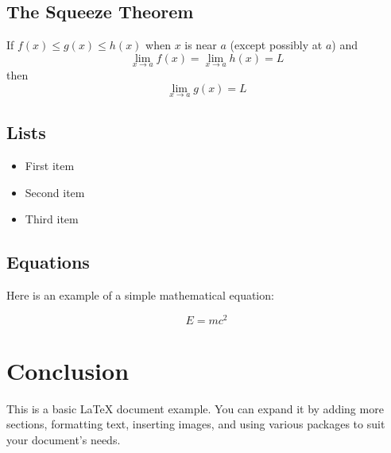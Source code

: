 \documentclass{article}
\begin{document}
\subsection*{The Squeeze Theorem}
If \( f(x) \leq g(x) \leq h(x)\) when \( x \) is near \( a \) (except possibly at \( a \)) and
\[
\lim_{x \to a} f(x) = \lim_{x \to a} h(x) = L
\]
then
\[
\lim_{x \to a} g(x) = L
\]

\subsection{Lists}
\begin{itemize}
    \item First item
    \item Second item
    \item Third item
\end{itemize}

\subsection{Equations}
Here is an example of a simple mathematical equation:

\begin{equation}
    E = mc^2
\end{equation}

\section{Conclusion}
This is a basic LaTeX document example. You can expand it by adding more sections, formatting text, inserting images, and using various packages to suit your document's needs.
\end{document}
